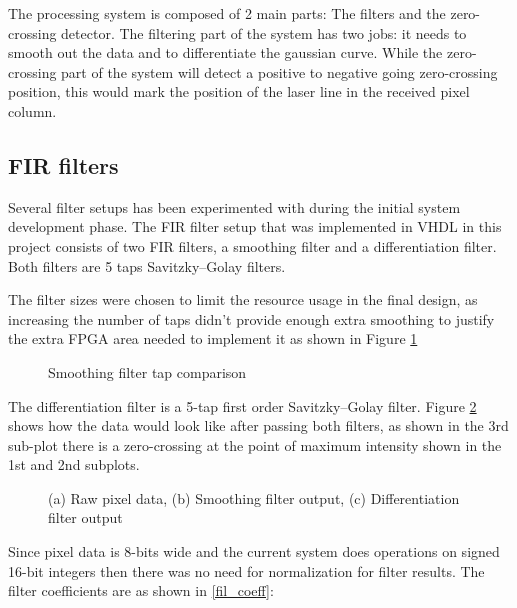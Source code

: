 The processing system is composed of 2 main parts: The filters and the zero-crossing detector. The filtering part of the system has two jobs: it needs to smooth out the data and to differentiate the gaussian curve. While the zero-crossing part of the system will detect a positive to negative going zero-crossing position, this would mark the position of the laser line in the received pixel column.




\subsection{FIR filters}

Several filter setups has been experimented with during the initial system development phase. The FIR filter setup that was implemented in VHDL in this project consists of two FIR filters, a smoothing filter and a differentiation filter. Both filters are 5 taps Savitzky–Golay filters.

The filter sizes were chosen to limit the resource usage in the final design, as increasing the number of taps didn't provide enough extra smoothing to justify the extra FPGA area needed to implement it as shown in Figure \ref{fig:smoothing_filter_tap_cmp}


\begin{figure}[h]
    \centering
    
    \caption{Smoothing filter tap comparison}
    \label{fig:smoothing_filter_tap_cmp}
\end{figure}


The differentiation filter is a 5-tap first order Savitzky–Golay filter. Figure \ref{fig:data_through_filters} shows how the data would look like after passing both filters, as shown in the 3rd sub-plot there is a zero-crossing at the point of maximum intensity shown in the 1st and 2nd subplots.

\begin{figure}[h]
    \centering
    
    \caption{(a) Raw pixel data, (b) Smoothing filter output, (c) Differentiation filter output}
    \label{fig:data_through_filters}
\end{figure}

Since pixel data is 8-bits wide and the current system does operations on signed 16-bit integers then there was no need for normalization for filter results. The filter coefficients are as shown in \eqref{fil_coeff}:

